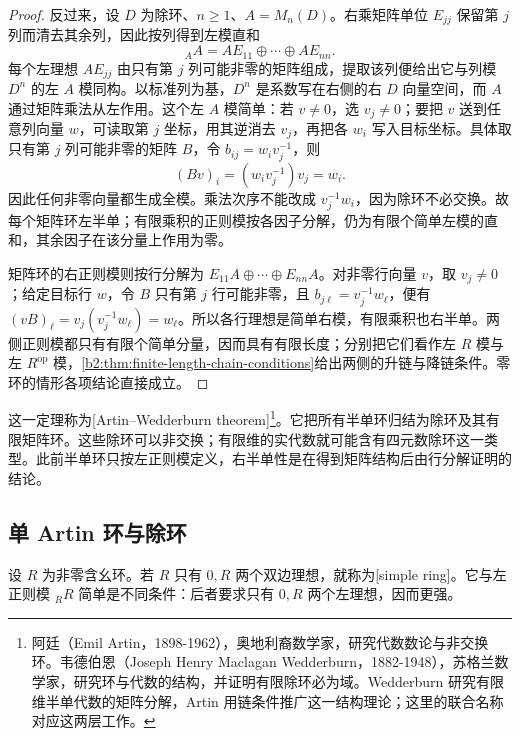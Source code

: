 \begin{proof}
	反过来，设 \(D\) 为除环、\(n\ge1\)、\(A=M_n(D)\)。右乘矩阵单位 \(E_{jj}\) 保留第 \(j\) 列而清去其余列，因此按列得到左模直和
	\[
		{}_AA=AE_{11}\oplus\cdots\oplus AE_{nn}.
	\]
	每个左理想 \(AE_{jj}\) 由只有第 \(j\) 列可能非零的矩阵组成，提取该列便给出它与列模 \(D^n\) 的左 \(A\) 模同构。以标准列为基，\(D^n\) 是系数写在右侧的右 \(D\) 向量空间，而 \(A\) 通过矩阵乘法从左作用。这个左 \(A\) 模简单：若 \(v\ne0\)，选 \(v_j\ne0\)；要把 \(v\) 送到任意列向量 \(w\)，可读取第 \(j\) 坐标，用其逆消去 \(v_j\)，再把各 \(w_i\) 写入目标坐标。具体取只有第 \(j\) 列可能非零的矩阵 \(B\)，令 \(b_{ij}=w_i v_j^{-1}\)，则
	\[
		(Bv)_i=(w_i v_j^{-1})v_j=w_i.
	\]
	因此任何非零向量都生成全模。乘法次序不能改成 \(v_j^{-1}w_i\)，因为除环不必交换。故每个矩阵环左半单；有限乘积的正则模按各因子分解，仍为有限个简单左模的直和，其余因子在该分量上作用为零。

	矩阵环的右正则模则按行分解为 \(E_{11}A\oplus\cdots\oplus E_{nn}A\)。对非零行向量 \(v\)，取 \(v_j\ne0\)；给定目标行 \(w\)，令 \(B\) 只有第 \(j\) 行可能非零，且 \(b_{j\ell}=v_j^{-1}w_\ell\)，便有 \((vB)_\ell=v_j(v_j^{-1}w_\ell)=w_\ell\)。所以各行理想是简单右模，有限乘积也右半单。两侧正则模都只有有限个简单分量，因而具有有限长度；分别把它们看作左 \(R\) 模与左 \(R^{\mathrm{op}}\) 模，\cref{b2:thm:finite-length-chain-conditions}给出两侧的升链与降链条件。零环的情形各项结论直接成立。
\end{proof}

这一定理称为[Artin--Wedderburn theorem]\footnote{阿廷（Emil Artin，1898-1962），奥地利裔数学家，研究代数数论与非交换环。韦德伯恩（Joseph Henry Maclagan Wedderburn，1882-1948），苏格兰数学家，研究环与代数的结构，并证明有限除环必为域。Wedderburn 研究有限维半单代数的矩阵分解，Artin 用链条件推广这一结构理论；这里的联合名称对应这两层工作。}。它把所有半单环归结为除环及其有限矩阵环。这些除环可以非交换；有限维的实代数就可能含有四元数除环这一类型。此前半单环只按左正则模定义，右半单性是在得到矩阵结构后由行分解证明的结论。

\subsection{单 Artin 环与除环}
\label{b2:subsec:1303:02}

\begin{definition}\label{b2:def:simple-ring}
	设 \(R\) 为非零含幺环。若 \(R\) 只有 \(0,R\) 两个双边理想，就称为[simple ring]。它与左正则模 \({}_RR\) 简单是不同条件：后者要求只有 \(0,R\) 两个左理想，因而更强。
\end{definition}

